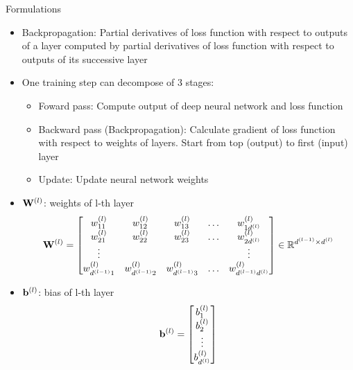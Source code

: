 \documentclass[10pt]{beamer}
\theoremstyle{remark}
\theoremstyle{definition}
\begin{document}
\begin{frame}[allowframebreaks]{Formulations}
	\begin{itemize}
		\item Backpropagation: Partial derivatives of loss function with respect to outputs of a layer computed by partial derivatives of loss function with respect to outputs of its successive layer
  		\item One training step can decompose of 3 stages:
		\begin{itemize}
			\item Foward pass: Compute output of deep neural network and loss function
   			\item Backward pass (Backpropagation): Calculate gradient of loss function with respect to weights of layers. Start from top (output) to first (input) layer
      		\item Update: Update neural network weights
		\end{itemize}
	\end{itemize}
	\framebreak
	\begin{itemize}
		\item $\bold{W}^{(l)}$: weights of l-th layer
    	\begin{equation*}
			\bold{W}^{(l)}=\begin{bmatrix} w_{11}^{(l)} & w_{12}^{(l)} & w_{13}^{(l)} & \dots & w_{1d^{(l)}}^{(l)} \\ w_{21}^{(l)} & w_{22}^{(l)} & w_{23}^{(l)} & \dots & w_{2d^{(l)}}^{(l)} \\ \vdots & \thickspace & \thickspace & \thickspace & \vdots \\ w_{d^{(l-1)}1}^{(l)} & w_{d^{(l-1)}2}^{(l)} & w_{d^{(l-1)}3}^{(l)} & \dots & w_{d^{(l-1)}d^{(l)}}^{(l)}\end{bmatrix} \in \mathbb{R}^{d^{(l-1)} \times d^{(l)}}
		\end{equation*}
		\item $\bold{b}^{(l)}$: bias of l-th layer
		\begin{equation*}
			\bold{b}^{(l)}=\begin{bmatrix} b_1^{(l)} \\  b_2^{(l)} \\ \vdots \\ b_{d^{(l)}}^{(l)} \end{bmatrix}
		\end{equation*}
		\begin{figure}
			\centering
\end{figure}
\end{itemize}
\end{frame}
\end{document}
